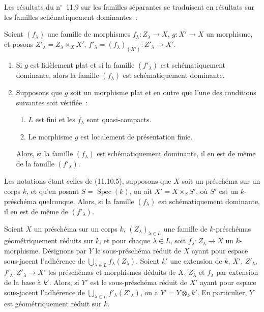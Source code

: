 Les résultats du n$^\circ$~11.9 sur les familles séparantes se traduisent en
résultats sur les familles schématiquement dominantes~:

\begin{theorem}[11.10.5]
\label{IV.11.10.5-fr}
Soient $(f_\lambda)$ une famille de morphismes
$f_\lambda:Z_\lambda\to X$, $g:X'\to X$ un morphisme, et posons
$Z'_\lambda=Z_\lambda\times_XX'$,
$f'_\lambda=(f_\lambda)_{(X')}:Z'_\lambda\to X'$.
\begin{enumerate}[label=(\roman*)]
  \item Si $g$ est fidèlement plat et si la famille $(f'_\lambda)$ est
  schématiquement dominante, alors la famille $(f_\lambda)$ est
  schématiquement dominante.
  \item Supposons que $g$ soit un morphisme plat et en outre que l'une des
  conditions suivantes soit vérifiée~:
  \begin{enumerate}[label=\emph{\alph*)}]
    \item $L$ est fini et les $f_\lambda$ sont quasi-compacts.
    \item Le morphisme $g$ est localement de présentation finie.
  \end{enumerate}
  Alors, si la famille $(f_\lambda)$ est schématiquement dominante, il en est
  de même de la famille $(f'_\lambda)$.
\end{enumerate}
\end{theorem}

\begin{proposition}[11.10.6]
\label{IV.11.10.6-fr}
Les notations étant celles de (11.10.5), supposons que $X$ soit un préschéma
sur un corps $k$, et qu'en posant $S=\operatorname{Spec}(k)$, on ait
$X'=X\times_SS'$, où $S'$ est un $k$-préschéma quelconque. Alors, si la famille
$(f_\lambda)$ est schématiquement dominante, il en est de même de
$(f'_\lambda)$.
\end{proposition}

\begin{corollary}[11.10.7]
\label{IV.11.10.7-fr}
Soient $X$ un préschéma sur un corps $k$, $(Z_\lambda)_{\lambda\in L}$ une
famille de $k$-préschémas géométriquement réduits sur $k$, et pour chaque
$\lambda\in L$, soit $f_\lambda:Z_\lambda\to X$ un $k$-morphisme. Désignons
par $Y$ le sous-préschéma réduit de $X$ ayant pour espace sous-jacent
l'adhérence de $\bigcup_{\lambda\in L}f_\lambda(Z_\lambda)$. Soient $k'$ une
extension de $k$, $X'$, $Z'_\lambda$,
$f'_\lambda:Z'_\lambda\to X'$ les préschémas et morphismes déduits de $X$,
$Z_\lambda$ et $f_\lambda$ par extension de la base à $k'$. Alors, si $Y'$ est
le sous-préschéma réduit de $X'$ ayant pour espace sous-jacent l'adhérence de
$\bigcup_{\lambda\in L}f'_\lambda(Z'_\lambda)$, on a
$Y'=Y\otimes_k k'$. En particulier, $Y$ est géométriquement réduit sur $k$.
\end{corollary}

